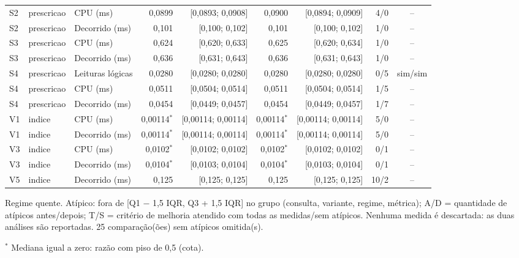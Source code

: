 {\begin{tabular}{lllrrrrrc}
S2 & prescricao & CPU (ms) & 0,0899 & [0,0893; 0,0908] & 0,0900 & [0,0894; 0,0909] & 4/0 & -- \\
S2 & prescricao & Decorrido (ms) & 0,101 & [0,100; 0,102] & 0,101 & [0,100; 0,102] & 1/0 & -- \\
S3 & prescricao & CPU (ms) & 0,624 & [0,620; 0,633] & 0,625 & [0,620; 0,634] & 1/0 & -- \\
S3 & prescricao & Decorrido (ms) & 0,636 & [0,631; 0,643] & 0,636 & [0,631; 0,643] & 1/0 & -- \\
S4 & prescricao & Leituras lógicas & 0,0280 & [0,0280; 0,0280] & 0,0280 & [0,0280; 0,0280] & 0/5 & sim/sim \\
S4 & prescricao & CPU (ms) & 0,0511 & [0,0504; 0,0514] & 0,0511 & [0,0504; 0,0514] & 1/5 & -- \\
S4 & prescricao & Decorrido (ms) & 0,0454 & [0,0449; 0,0457] & 0,0454 & [0,0449; 0,0457] & 1/7 & -- \\
V1 & indice & CPU (ms) & 0,00114$^{*}$ & [0,00114; 0,00114] & 0,00114$^{*}$ & [0,00114; 0,00114] & 5/0 & -- \\
V1 & indice & Decorrido (ms) & 0,00114$^{*}$ & [0,00114; 0,00114] & 0,00114$^{*}$ & [0,00114; 0,00114] & 5/0 & -- \\
V3 & indice & CPU (ms) & 0,0102$^{*}$ & [0,0102; 0,0102] & 0,0102$^{*}$ & [0,0102; 0,0102] & 0/1 & -- \\
V3 & indice & Decorrido (ms) & 0,0104$^{*}$ & [0,0103; 0,0104] & 0,0104$^{*}$ & [0,0103; 0,0104] & 0/1 & -- \\
V5 & indice & Decorrido (ms) & 0,125 & [0,125; 0,125] & 0,125 & [0,125; 0,125] & 10/2 & -- \\
\bottomrule
\end{tabular}\par
\vspace{3pt}
\begin{minipage}{\linewidth}\footnotesize
Regime quente. Atípico: fora de [Q1 $-$ 1,5 IQR, Q3 + 1,5 IQR] no grupo (consulta, variante, regime, métrica); A/D = quantidade de atípicos antes/depois; T/S = critério de melhoria atendido com todas as medidas/sem atípicos. Nenhuma medida é descartada: as duas análises são reportadas. 25 comparação(ões) sem atípicos omitida(s).\par
$^{*}$ Mediana igual a zero: razão com piso de 0,5 (cota).
\end{minipage}
}
